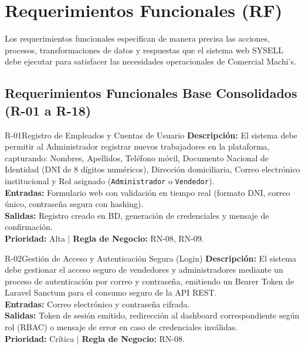 
\section{Requerimientos Funcionales (RF)}

Los requerimientos funcionales especifican de manera precisa las acciones, procesos, transformaciones de datos y respuestas que el sistema web SYSELL debe ejecutar para satisfacer las necesidades operacionales de Comercial Machi's.

\subsection{Requerimientos Funcionales Base Consolidados (R-01 a R-18)}

\begin{reqbox}{R-01}{Registro de Empleados y Cuentas de Usuario}
\textbf{Descripción:} El sistema debe permitir al Administrador registrar nuevos trabajadores en la plataforma, capturando: Nombres, Apellidos, Teléfono móvil, Documento Nacional de Identidad (DNI de 8 dígitos numéricos), Dirección domiciliaria, Correo electrónico institucional y Rol asignado (\texttt{Administrador} o \texttt{Vendedor}).\\
\textbf{Entradas:} Formulario web con validación en tiempo real (formato DNI, correo único, contraseña segura con hashing).\\
\textbf{Salidas:} Registro creado en BD, generación de credenciales y mensaje de confirmación.\\
\textbf{Prioridad:} Alta | \textbf{Regla de Negocio:} RN-08, RN-09.
\end{reqbox}

\begin{reqbox}{R-02}{Gestión de Acceso y Autenticación Segura (Login)}
\textbf{Descripción:} El sistema debe gestionar el acceso seguro de vendedores y administradores mediante un proceso de autenticación por correo y contraseña, emitiendo un Bearer Token de Laravel Sanctum para el consumo seguro de la API REST.\\
\textbf{Entradas:} Correo electrónico y contraseña cifrada.\\
\textbf{Salidas:} Token de sesión emitido, redirección al dashboard correspondiente según rol (RBAC) o mensaje de error en caso de credenciales inválidas.\\
\textbf{Prioridad:} Crítica | \textbf{Regla de Negocio:} RN-08.
\end{reqbox}

